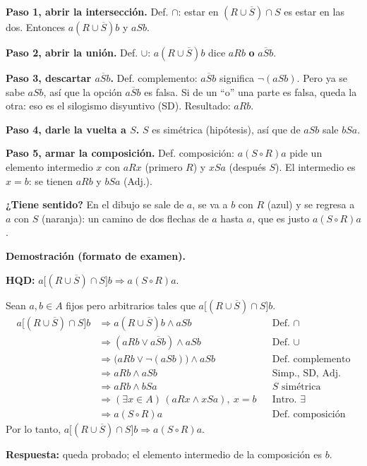\documentclass[11pt]{article}
\begin{document}
\begin{explica}
\textbf{Paso 1, abrir la intersección.} Def. $\cap$: estar en $(R\cup\overline S)\cap S$ es estar en las dos. Entonces $a(R\cup\overline S)b$ y $aSb$.

\textbf{Paso 2, abrir la unión.} Def. $\cup$: $a(R\cup\overline S)b$ dice $aRb$ \textbf{o} $a\overline Sb$.

\textbf{Paso 3, descartar $a\overline Sb$.} Def. complemento: $a\overline Sb$ significa $\neg(aSb)$. Pero ya se sabe $aSb$, así que la opción $a\overline Sb$ es falsa. Si de un ``o'' una parte es falsa, queda la otra: eso es el silogismo disyuntivo (SD). Resultado: $aRb$.

\textbf{Paso 4, darle la vuelta a $S$.} $S$ es simétrica (hipótesis), así que de $aSb$ sale $bSa$.

\textbf{Paso 5, armar la composición.} Def. composición: $a(S\circ R)a$ pide un elemento intermedio $x$ con $aRx$ (primero $R$) y $xSa$ (después $S$). El intermedio es $x=b$: se tienen $aRb$ y $bSa$ (Adj.).

\textbf{¿Tiene sentido?} En el dibujo se sale de $a$, se va a $b$ con $R$ (azul) y se regresa a $a$ con $S$ (naranja): un camino de dos flechas de $a$ hasta $a$, que es justo $a(S\circ R)a$.
\end{explica}

\textbf{Demostración (formato de examen).}

\textbf{HQD:} $a\big[(R\cup\overline S)\cap S\big]b\Rightarrow a(S\circ R)a$.

Sean $a,b\in A$ fijos pero arbitrarios tales que $a\big[(R\cup\overline S)\cap S\big]b$.
\begin{align*}
a\big[(R\cup\overline S)\cap S\big]b &\Rightarrow a(R\cup\overline S)b\wedge aSb && \text{Def. }\cap\\
&\Rightarrow (aRb\vee a\overline Sb)\wedge aSb && \text{Def. }\cup\\
&\Rightarrow \big(aRb\vee\neg(aSb)\big)\wedge aSb && \text{Def. complemento}\\
&\Rightarrow aRb\wedge aSb && \text{Simp., SD, Adj.}\\
&\Rightarrow aRb\wedge bSa && S \text{ simétrica}\\
&\Rightarrow (\exists x\in A)\,(aRx\wedge xSa),\ x=b && \text{Intro. }\exists\\
&\Rightarrow a(S\circ R)a && \text{Def. composición}
\end{align*}
Por lo tanto, $a\big[(R\cup\overline S)\cap S\big]b\Rightarrow a(S\circ R)a$.

\textbf{Respuesta:} queda probado; el elemento intermedio de la composición es $b$.
\end{document}
